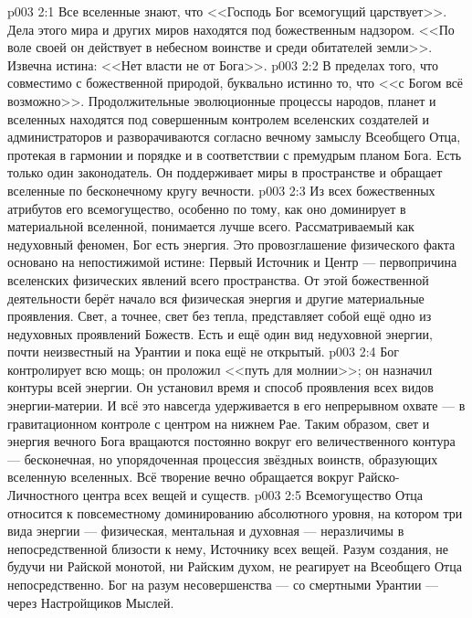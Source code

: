 \vs p003 2:1 Все вселенные знают, что <<Господь Бог всемогущий царствует>>. Дела этого мира и других миров находятся под божественным надзором. <<По воле своей он действует в небесном воинстве и среди обитателей земли>>. Извечна истина: <<Нет власти не от Бога>>.
\vs p003 2:2 В пределах того, что совместимо с божественной природой, буквально истинно то, что <<с Богом всё возможно>>. Продолжительные эволюционные процессы народов, планет и вселенных находятся под совершенным контролем вселенских создателей и администраторов и разворачиваются согласно вечному замыслу Всеобщего Отца, протекая в гармонии и порядке и в соответствии с премудрым планом Бога. Есть только один законодатель. Он поддерживает миры в пространстве и обращает вселенные по бесконечному кругу вечности.
\vs p003 2:3 Из всех божественных атрибутов его всемогущество, особенно по тому, как оно доминирует в материальной вселенной, понимается лучше всего. Рассматриваемый как недуховный феномен, Бог есть энергия. Это провозглашение физического факта основано на непостижимой истине: Первый Источник и Центр --- первопричина вселенских физических явлений всего пространства. От этой божественной деятельности берёт начало вся физическая энергия и другие материальные проявления. Свет, а точнее, свет без тепла, представляет собой ещё одно из недуховных проявлений Божеств. Есть и ещё один вид недуховной энергии, почти неизвестный на Урантии и пока ещё не открытый.
\vs p003 2:4 Бог контролирует всю мощь; он проложил <<путь для молнии>>; он назначил контуры всей энергии. Он установил время и способ проявления всех видов энергии\hyp{}материи. И всё это навсегда удерживается в его непрерывном охвате --- в гравитационном контроле с центром на нижнем Рае. Таким образом, свет и энергия вечного Бога вращаются постоянно вокруг его величественного контура --- бесконечная, но упорядоченная процессия звёздных воинств, образующих вселенную вселенных. Всё творение вечно обращается вокруг Райско\hyp{}Личностного центра всех вещей и существ.
\vs p003 2:5 Всемогущество Отца относится к повсеместному доминированию абсолютного уровня, на котором три вида энергии --- физическая, ментальная и духовная --- неразличимы в непосредственной близости к нему, Источнику всех вещей. Разум создания, не будучи ни Райской монотой, ни Райским духом, не реагирует на Всеобщего Отца непосредственно. Бог  на разум несовершенства --- со смертными Урантии --- через Настройщиков Мыслей.
